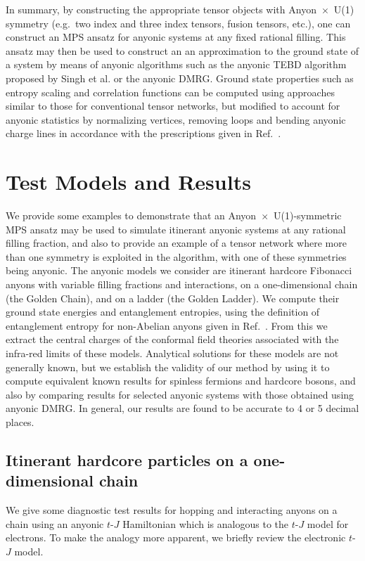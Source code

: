 \documentclass[aps,reprint,superscriptaddress,amsmath,amssymb,amsfonts,prb]{revtex4-1}
\newcommand{\rcite}[1]{Ref.~\onlinecite{#1}}
\begin{document}
In summary, by constructing the appropriate tensor objects with Anyon~$\times$~U(1) symmetry (e.g.~two index and three index tensors, fusion tensors, etc.), one can construct an MPS ansatz for anyonic systems at any fixed rational filling. This ansatz may then be used to construct an an approximation to the ground state of a system by means of anyonic algorithms such as the anyonic TEBD algorithm proposed by Singh et al.\cite{Singh} or the anyonic DMRG.\cite{Pfeifer2015} Ground state properties such as entropy scaling and correlation functions can be computed using approaches similar to those for conventional tensor networks, but modified to account for anyonic statistics by normalizing vertices, removing loops and bending anyonic charge lines in accordance with the prescriptions given in Ref.~. 



\section{Test Models and Results}
We provide some examples to demonstrate that an Anyon~$\times$~U(1)-symmetric MPS ansatz may be used to simulate itinerant anyonic systems at any rational filling fraction, and also to provide an example of a tensor network where more than one symmetry is exploited in the algorithm, with one of these symmetries being anyonic. The anyonic models we consider are itinerant hardcore Fibonacci anyons with variable filling fractions and interactions, on a one-dimensional chain (the Golden Chain\cite{Feiguin2007}), and on  a ladder (the Golden Ladder). We compute their ground state energies and entanglement entropies, using the definition of entanglement entropy for non-Abelian anyons given in \rcite{Pfeifer2014a}. From this we extract the central charges of the conformal field theories associated with the infra-red limits of these models. Analytical solutions for these models are not generally known, but we establish the validity of our method by using it to compute equivalent known results for spinless fermions 
and hardcore bosons, and also by comparing results for selected anyonic systems with those obtained 
using anyonic DMRG.\cite{Pfeifer2015} In general, our results are found to be accurate to 4 or 5 decimal places. 



\subsection{Itinerant hardcore particles on a one-dimensional chain}
We give some diagnostic test results for hopping and interacting anyons on a chain using an anyonic $t$-$J$ Hamiltonian which is analogous to the $t$-$J$ model for electrons. To make the analogy more apparent, we briefly review the electronic $t$-$J$ model.
\end{document}
